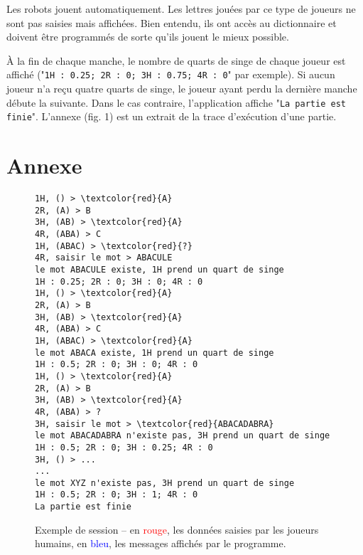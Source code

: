 \documentclass[10pt,a4paper,oneside]{article}
\begin{document}
\medskip

Les robots jouent automatiquement. Les lettres jouées par ce type de joueurs ne sont pas saisies mais affichées. Bien entendu, ils ont accès au dictionnaire et doivent être programmés de sorte qu'ils jouent le mieux possible.

\medskip

\`A la fin de chaque manche, le nombre de quarts de singe de chaque joueur est affiché ("\texttt{1H : 0.25; 2R : 0; 3H : 0.75; 4R : 0}" par exemple). Si aucun joueur n'a reçu quatre quarts de singe, le joueur ayant perdu la dernière manche débute la suivante. Dans le cas contraire, l'application affiche "\texttt{La partie est finie}". L'annexe (fig. 1) est un extrait de la trace d'exécution d'une partie.

\newpage

\section*{Annexe}
\begin{center}
\begin{figure*}[ht]
\setlength{\columnseprule}{.25mm}
\setlength{\columnsep}{15.mm}
\color{blue}
\begin{Verbatim}[commandchars=\\\{\}]
1H, () > \textcolor{red}{A}
2R, (A) > B
3H, (AB) > \textcolor{red}{A}
4R, (ABA) > C
1H, (ABAC) > \textcolor{red}{?}
4R, saisir le mot > ABACULE
le mot ABACULE existe, 1H prend un quart de singe
1H : 0.25; 2R : 0; 3H : 0; 4R : 0
1H, () > \textcolor{red}{A}
2R, (A) > B
3H, (AB) > \textcolor{red}{A}
4R, (ABA) > C
1H, (ABAC) > \textcolor{red}{A}
le mot ABACA existe, 1H prend un quart de singe
1H : 0.5; 2R : 0; 3H : 0; 4R : 0
1H, () > \textcolor{red}{A}
2R, (A) > B
3H, (AB) > \textcolor{red}{A}
4R, (ABA) > ?
3H, saisir le mot > \textcolor{red}{ABACADABRA}
le mot ABACADABRA n'existe pas, 3H prend un quart de singe
1H : 0.5; 2R : 0; 3H : 0.25; 4R : 0
3H, () > ...
...
le mot XYZ n'existe pas, 3H prend un quart de singe
1H : 0.5; 2R : 0; 3H : 1; 4R : 0
La partie est finie
\end{Verbatim}
\color{black}
	\caption{Exemple de session -- en \textcolor{red}{rouge}, les données saisies par les joueurs humains, en \textcolor{blue}{bleu}, les messages affichés par le programme.}
	\label{fig:session}
\end{figure*}
\end{center}
\end{document}
